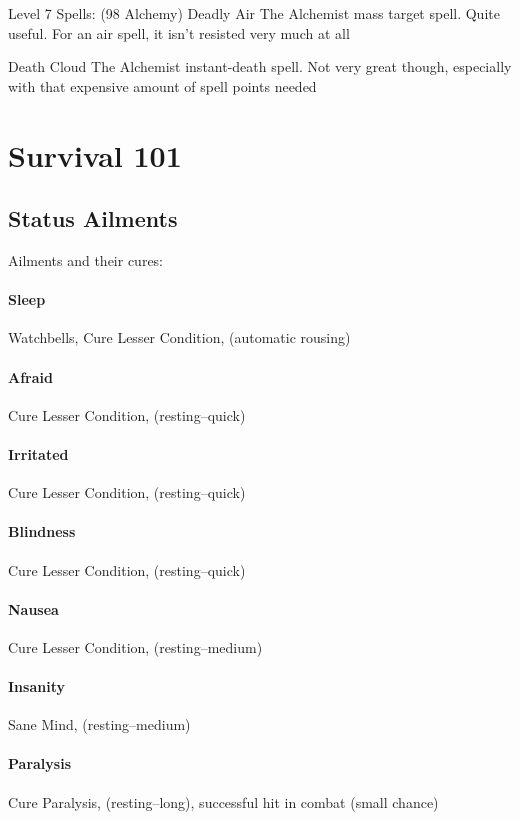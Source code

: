 \documentclass[12pt]{article}
\let\oldparagraph\paragraph
\renewcommand{\paragraph}[1]{\oldparagraph{#1}\mbox{}}
\begin{document}
Level 7 Spells: (98 Alchemy) Deadly Air The Alchemist mass target spell.
Quite useful. For an air spell, it isn't resisted very much at all

Death Cloud The Alchemist instant-death spell. Not very great though,
especially with that expensive amount of spell points needed

\section{Survival 101}\label{survival-101}

\subsection{Status Ailments}\label{status-ailments}

Ailments and their cures:

\paragraph{Sleep} Watchbells, Cure Lesser Condition, (automatic
rousing)

\paragraph{Afraid} Cure Lesser Condition, (resting--quick)

\paragraph{Irritated} Cure Lesser Condition, (resting--quick)

\paragraph{Blindness} Cure Lesser Condition, (resting--quick)

\paragraph{Nausea} Cure Lesser Condition, (resting--medium)

\paragraph{Insanity} Sane Mind, (resting--medium)

\paragraph{Paralysis} Cure Paralysis, (resting--long), successful hit in
combat (small chance)
\end{document}
